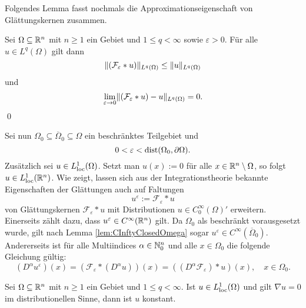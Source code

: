 Folgendes Lemma fasst nochmals die Approximationseigenschaft von Glättungskernen zusammen.

\begin{lem}
  \label{lem:mollification}
  Sei $\Omega \subseteq \mathbb{R}^n$ mit $n \geq 1$ ein Gebiet und $1 \leq q < \infty$ sowie $\varepsilon > 0$.
  Für alle $u \in L^q(\Omega)$ gilt dann
  $$
  \lVert (\mathcal{F}_\varepsilon \ast u) \rVert_{L^q(\Omega)} \leq  \lVert u \rVert_{L^q(\Omega)}
  $$
  und
  \begin{displaymath}
    \lim_{\varepsilon \to 0} \lVert (\mathcal{F}_\varepsilon \ast u) - u \rVert_{L^q(\Omega)} = 0. 
  \end{displaymath}
  \qed
\end{lem}

Sei nun $\Omega_0 \subseteq \overline\Omega_0 \subseteq \Omega$ ein beschränktes Teilgebiet und
\begin{equation}
  \label{eq:convolutionEpsilon}
  0 < \varepsilon < \operatorname{dist}(\Omega_0, \partial\Omega).
\end{equation}
Zusätzlich sei $u \in L^1_{\operatorname{loc}}(\Omega)$.
Setzt man $u(x) := 0$ für alle $x \in \mathbb{R}^n \setminus \Omega$, so folgt $u \in L^1_{\operatorname{loc}}(\mathbb{R}^n)$.
Wie \cite[S.171, Theorem 6.30(b)]{rudin1991fa} zeigt, lassen sich aus der Integrationstheorie bekannte Eigenschaften der Glättungen auch auf Faltungen 
$$
u^\varepsilon := \mathcal{F}_\varepsilon \ast u
$$
von Glättungskernen $\mathcal{F}_\varepsilon \ast u$ mit Distributionen $u \in C_0^\infty(\Omega)'$ erweitern.
Einerseits zählt dazu, dass $u^\varepsilon \in C^\infty(\mathbb{R}^n)$ gilt.
Da $\Omega_0$ als beschränkt vorausgesetzt wurde, gilt nach Lemma \ref{lem:CInftyClosedOmega} sogar $u^\varepsilon \in C^\infty(\overline\Omega_0)$.
Andererseits ist für alle Multiindices $\alpha \in \mathbb{N}_0^n$ und alle $x \in \Omega_0$ die folgende Gleichung gültig:
\begin{equation}
  \label{eq:convolutionDiff}
  (D^\alpha u^\varepsilon)(x) 
  = (\mathcal{F}_\varepsilon \ast (D^\alpha u))(x)
  = ( (D^\alpha \mathcal{F}_\varepsilon) \ast u)(x), \quad x \in \Omega_0.
\end{equation}

\begin{lem}
  Sei $\Omega \subseteq \mathbb{R}^n$ mit $n \geq 1$ ein Gebiet und $1 \leq q < \infty$.
  Ist $u \in L^1_{\operatorname{loc}}(\Omega)$ und gilt $\nabla u = 0$ im distributionellen Sinne, dann ist $u$ konstant.
\end{lem}

